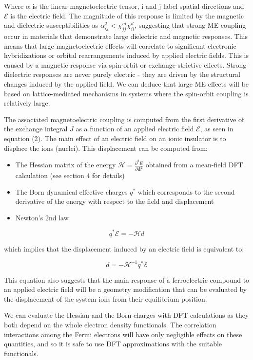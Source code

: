 \documentclass[10pt]{article}
\begin{document}
Where $\alpha$ is the linear magnetoelectric tensor, i and j label spatial directions and $\mathcal{E}$ is the electric field. The magnitude of this response is limited by the magnetic and dielectric susceptibilities as $\alpha^2_{ij} < \chi^m_{jj}\chi^d_{ii}$, suggesting that strong ME coupling occur in materials that demonstrate large dielectric and magnetic responses. This means that large magnetoelectric effects will correlate to significant electronic hybridizations or orbital rearrangements induced by applied electric fields. This is caused by a magnetic response via spin-orbit or exchange-strictive effects. Strong dielectric responses are never purely electric - they are driven by the structural changes induced by the applied field. We can deduce that large ME effects will be based on lattice-mediated mechanisms in systems where the spin-orbit coupling is relatively large. 

The associated magnetoelectric coupling is computed from the first derivative of the exchange integral $J$ as a function of an applied electric field $\mathcal{E}$, as seen in equation (2). The main effect of an electric field on an ionic insulator is to displace the ions (nuclei). This displacement can be computed from:
\begin{itemize}
	\item The Hessian matrix of the
	energy $\mathcal{H} = \frac{\partial^2 E}{\partial \mathbf{d} ^2} $ obtained
	from a mean-field DFT calculation (see section 4 for details)
	\item The Born dynamical effective charges $q^*$ which corresponds to the second
	derivative of the energy with respect to the field and displacement
	\item Newton's 2nd law
\end{itemize}

\begin{equation}
	q^* \mathcal{E} = -\mathcal{H} d
\end{equation}

which implies that the displacement induced by an electric field is equivalent to:

$$ d = -\mathcal{H}^{-1} q^* \mathcal{E} $$

This equation also suggests that the main response of a ferroelectric compound to an applied electric field will be a geometry modification that can be evaluated by the displacement of the system ions from their equilibrium position. 

We can evaluate the Hessian and the Born charges with DFT calculations as they both depend on the whole electron density functionals. The correlation interactions among the Fermi electrons will have only negligible effects on these quantities, and so it is safe to use DFT approximations with the suitable functionals.
\end{document}
